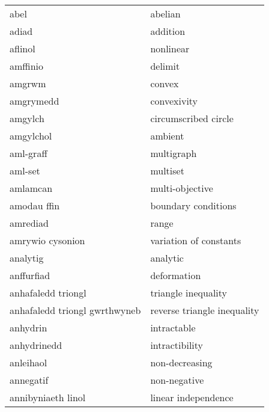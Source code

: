 \begin{supertabular}{p{0.22\textwidth}p{0.22\textwidth}}
                           abel &                          abelian \\
                          adiad &                         addition \\
                        aflinol &                        nonlinear \\
                       amffinio &                          delimit \\
                         amgrwm &                           convex \\
                      amgrymedd &                      convexivity \\
                        amgylch &             circumscribed circle \\
                      amgylchol &                          ambient \\
                      aml-graff &                       multigraph \\
                        aml-set &                         multiset \\
                       amlamcan &                  multi-objective \\
                    amodau ffin &              boundary conditions \\
                       amrediad &                            range \\
               amrywio cysonion &           variation of constants \\
                       analytig &                         analytic \\
                     anffurfiad &                      deformation \\
             anhafaledd triongl &              triangle inequality \\
  anhafaledd triongl gwrthwyneb &      reverse triangle inequality \\
                       anhydrin &                      intractable \\
                    anhydrinedd &                   intractibility \\
                      anleihaol &                   non-decreasing \\
                      annegatif &                     non-negative \\
             annibyniaeth linol &              linear independence \\

\end{supertabular}
